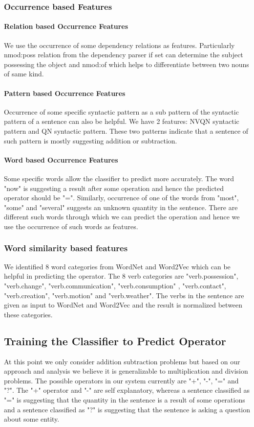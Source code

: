 \documentclass[11pt]{article}
\begin{document}
\subsubsection{Occurrence based Features}
\paragraph{Relation based Occurrence Features}
We use the occurrence of some dependency relations as features. Particularly nmod:poss relation from the dependency parser if set can determine the subject possessing the object and nmod:of which helps to differentiate between two nouns of same kind.

\paragraph{Pattern based Occurrence Features}
Occurrence of some specific syntactic pattern as a sub pattern of the syntactic pattern of a sentence can also be helpful. We have 2 features: NVQN syntactic pattern and QN syntactic pattern. These two patterns indicate that a sentence of such pattern is mostly suggesting addition or subtraction.

\paragraph{Word based Occurrence Features}
Some specific words allow the classifier to predict more accurately. The word "now" is suggesting a result after some operation and hence the predicted operator should be "=". Similarly, occurrence of one of the words from "most", "some" and "several" suggests an unknown quantity in the sentence. There are different such words through which we can predict the operation and hence we use the occurrence of such words as features.

\subsubsection{Word similarity based features}
We identified 8 word categories from WordNet and Word2Vec which can be helpful in predicting the operator. The 8 verb categories are "verb.possession", "verb.change", "verb.communication", "verb.consumption" , "verb.contact", "verb.creation", "verb.motion" and "verb.weather". The verbs in the sentence are given as input to WordNet and Word2Vec and the result is normalized between these categories.

\subsection{Training the Classifier to Predict Operator}
At this point we only consider addition subtraction problems but based on our approach and analysis we believe it is generalizable to multiplication and division problems. The possible operators in our system currently are "+", "-", "=" and "?". The "+" operator and "-" are self explanatory, whereas a sentence classified as "=" is suggesting that the quantity in the sentence is a result of some operations and a sentence classified as "?" is suggesting that the sentence is asking a question about some entity.
\end{document}
